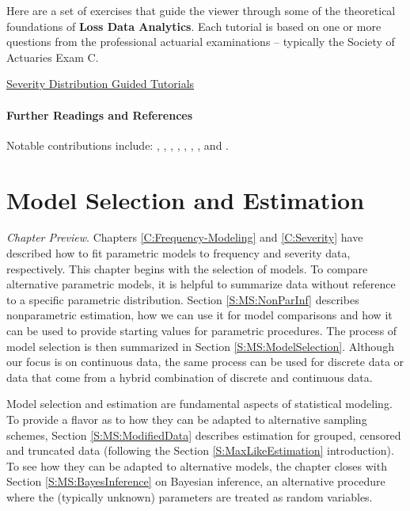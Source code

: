 \documentclass[]{book}
\theoremstyle{definition}
\theoremstyle{definition}
\theoremstyle{definition}
\theoremstyle{remark}
\begin{document}
Here are a set of exercises that guide the viewer through some of the
theoretical foundations of \textbf{Loss Data Analytics}. Each tutorial
is based on one or more questions from the professional actuarial
examinations -- typically the Society of Actuaries Exam C.

\href{http://www.ssc.wisc.edu/~jfrees/loss-data-analytics/chapter-3-modeling-loss-severity/loss-data-analytics-severity-problems/}{Severity
Distribution Guided Tutorials}

\subsubsection*{Further Readings and
References}\label{further-readings-and-references}

Notable contributions include: \citet{cummins1991managing},
\citet{frees2008hierarchical}, \citet{klugman2012},
\citet{kreer2015goodness}, \citet{mcdonald1984some},
\citet{mcdonald1995generalization}, \citet{tevet2016applying}, and
\citet{venter1983transformed}.

\chapter{Model Selection and Estimation}\label{C:ModelSelection}

\emph{Chapter Preview}. Chapters \ref{C:Frequency-Modeling} and
\ref{C:Severity} have described how to fit parametric models to
frequency and severity data, respectively. This chapter begins with the
selection of models. To compare alternative parametric models, it is
helpful to summarize data without reference to a specific parametric
distribution. Section \ref{S:MS:NonParInf} describes nonparametric
estimation, how we can use it for model comparisons and how it can be
used to provide starting values for parametric procedures. The process
of model selection is then summarized in Section
\ref{S:MS:ModelSelection}. Although our focus is on continuous data, the
same process can be used for discrete data or data that come from a
hybrid combination of discrete and continuous data.

Model selection and estimation are fundamental aspects of statistical
modeling. To provide a flavor as to how they can be adapted to
alternative sampling schemes, Section \ref{S:MS:ModifiedData} describes
estimation for grouped, censored and truncated data (following the
Section \ref{S:MaxLikeEstimation} introduction). To see how they can be
adapted to alternative models, the chapter closes with Section
\ref{S:MS:BayesInference} on Bayesian inference, an alternative
procedure where the (typically unknown) parameters are treated as random
variables.
\end{document}
